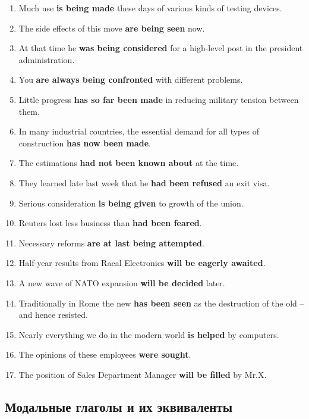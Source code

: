 \documentclass[main.tex]{subfiles}
\begin{document}
\begin{enumerate}[nosep,leftmargin=*]
	\item Much use \textbf{is being made} these days of various kinds of testing devices.
	\item The side effects of this move \textbf{are being seen} now.
	\item At that time he \textbf{was being considered} for a high-level post in the president administration.
	\item You \textbf{are always being confronted} with different problems.
	\item Little progress \textbf{has so far been made} in reducing military tension between them.
	\item In many industrial countries, the essential demand for all types of construction \textbf{has now been made}.
	\item The estimations \textbf{had not been known about} at the time.
	\item They learned late last week that he \textbf{had been refused} an exit visa.
	\item Serious consideration \textbf{is being given} to growth of the union.
	\item Reuters lost less business than \textbf{had been feared}.
	\item Necessary reforms \textbf{are at last being attempted}.
	\item Half-year results from Racal Electronics \textbf{will be eagerly awaited}.
	\item A new wave of NATO expansion \textbf{will be decided} later.
	\item Traditionally in Rome the new \textbf{has been seen} as the destruction of the old -- and hence resisted.
	\item Nearly everything we do in the modern world \textbf{is helped} by computers.
	\item The opinions of these employees \textbf{were sought}.
	\item The position of Sales Department Manager \textbf{will be filled} by Mr.X.
\end{enumerate}

\subsection{Модальные глаголы и их эквиваленты}

\end{document}
